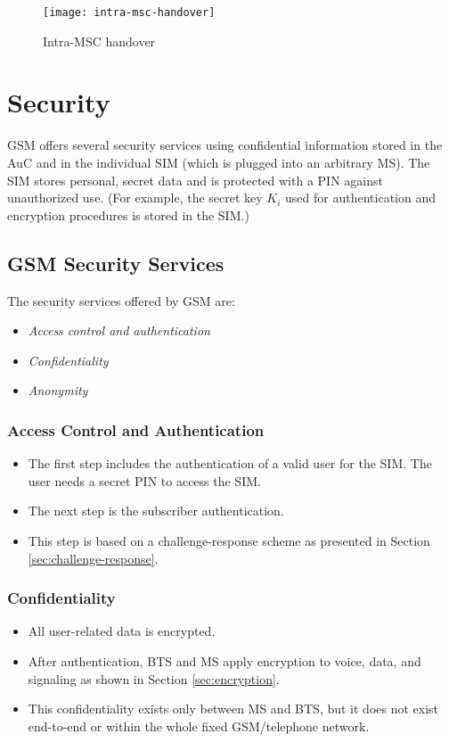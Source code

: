 
\begin{figure}[ht!]
	\centering
	\texttt{[image: intra-msc-handover]}
	\caption{Intra-MSC handover}\label{fig:intra-msc-handover}
\end{figure}



\section{Security}
GSM offers several security services using confidential information stored in the AuC and in the individual SIM (which is plugged into an arbitrary MS). The SIM stores personal, secret data and is protected with a PIN against unauthorized use. (For example, the secret key \(K_i\) used for authentication and encryption procedures is stored in the SIM.) 

\subsection{GSM Security Services}
The security services offered by GSM are:
\begin{itemize}
	\item \textit{Access control and authentication}
	\item \textit{Confidentiality}
	\item \textit{Anonymity}
\end{itemize}

\subsubsection{Access Control and Authentication}
\begin{itemize}
	\item The first step includes the authentication of a valid user for the SIM. The user needs a secret PIN to access the SIM.
	\item The next step is the subscriber authentication. 
	\item This step is based on a challenge-response scheme as presented in Section \ref{sec:challenge-response}.
\end{itemize}

\subsubsection{Confidentiality}
\begin{itemize}
	\item All user-related data is encrypted. 
	\item After authentication, BTS and MS apply encryption to voice, data, and signaling as shown in Section \ref{sec:encryption}. 
	\item This confidentiality exists only between MS and BTS, but it does not exist end-to-end or within the whole fixed GSM/telephone network.
\end{itemize}


